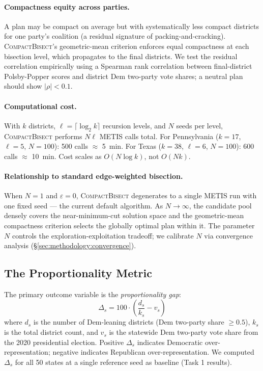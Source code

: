 \paragraph{Compactness equity across parties.}
A plan may be compact on average but with systematically less compact
districts for one party's coalition (a residual signature of
packing-and-cracking). \textsc{CompactBisect}'s geometric-mean criterion
enforces equal compactness at each bisection level, which propagates to
the final districts. We test the residual correlation empirically using
a Spearman rank correlation between final-district Polsby-Popper scores
and district Dem two-party vote shares; a neutral plan should show
$|\rho| < 0.1$.

\paragraph{Computational cost.}
With $k$ districts, $\ell = \lceil\log_2 k\rceil$ recursion levels,
and $N$ seeds per level, \textsc{CompactBisect} performs $N\ell$ METIS
calls total. For Pennsylvania ($k=17$, $\ell=5$, $N=100$): 500 calls
$\approx$ 5~min. For Texas ($k=38$, $\ell=6$, $N=100$): 600 calls
$\approx$ 10~min. Cost scales as $O(N\log k)$, not $O(Nk)$.

\paragraph{Relationship to standard edge-weighted bisection.}
When $N=1$ and $\varepsilon=0$, \textsc{CompactBisect} degenerates to
a single METIS run with one fixed seed --- the current default algorithm.
As $N\to\infty$, the candidate pool densely covers the near-minimum-cut
solution space and the geometric-mean compactness criterion selects the
globally optimal plan within it. The parameter $N$ controls the
exploration-exploitation tradeoff; we calibrate $N$ via convergence
analysis (\S\ref{sec:methodology:convergence}).

\subsection{The Proportionality Metric}
\label{sec:methodology:metric}

The primary outcome variable is the \emph{proportionality gap}:
\[
  \Delta_s = 100 \cdot \left(\frac{d_s}{k_s} - v_s\right)
\]
where $d_s$ is the number of Dem-leaning districts (Dem two-party share
$\geq 0.5$), $k_s$ is the total district count, and $v_s$ is the statewide
Dem two-party vote share from the 2020 presidential election. Positive
$\Delta_s$ indicates Democratic over-representation; negative indicates
Republican over-representation. We computed $\Delta_s$ for all 50 states at a
single reference seed as baseline (Task 1 results).

